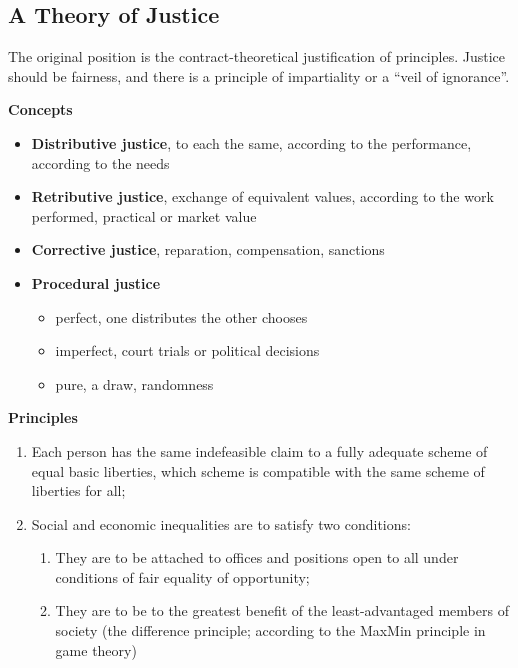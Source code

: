 \documentclass[11pt]{article}
\theoremstyle{definition}
\begin{document}
\clearpage

\subsection{A Theory of Justice}
The original position is the contract-theoretical justification of principles. Justice should be fairness, and there is a principle of impartiality or a \textquotedblleft veil of ignorance\textquotedblright.

\vspace{1em}
\noindent
\textbf{Concepts}
\begin{itemize}
	\item \textbf{Distributive justice}, to each the same, according to the performance, according to the needs
	\item \textbf{Retributive justice}, exchange of equivalent values, according to the work performed, practical or market value
	\item \textbf{Corrective justice}, reparation, compensation, sanctions
	\item \textbf{Procedural justice}
	\begin{itemize}
		\item perfect, one distributes the other chooses
		\item imperfect, court trials or political decisions
		\item pure, a draw, randomness
	\end{itemize}
\end{itemize}
\vspace{1em}
\noindent
\textbf{Principles}
\begin{enumerate}
	\item Each person has the same indefeasible claim to a fully adequate scheme of equal basic liberties, which scheme is compatible with the same scheme of liberties for all;
	\item Social and economic inequalities are to satisfy two conditions:
	\begin{enumerate}
		\item They are to be attached to offices and positions open to all under conditions of fair equality of opportunity;
		\item They are to be to the greatest benefit of the least-advantaged members of society (the difference principle; according to the MaxMin principle in game theory)
	\end{enumerate}
\end{enumerate}
\end{document}
